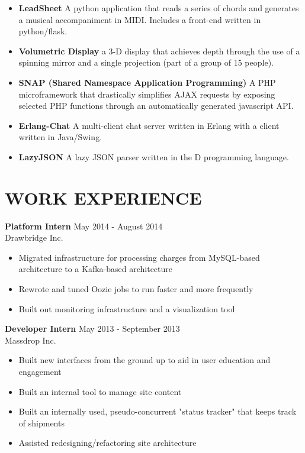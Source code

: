 \documentclass[line,margin]{res}
\begin{document}
\begin{resume}
\begin{itemize} \itemsep -2pt


\item {\bf LeadSheet} A python application that reads a series of chords and 
   generates a musical accompaniment in MIDI. Includes a front-end written in 
   python/flask. 

\item {\bf Volumetric Display} a 3-D display that achieves depth through the 
   use of a spinning mirror and a single projection 
   (part of a group of 15 people).

\item {\bf SNAP (Shared Namespace Application Programming)} 
   A PHP microframework that drastically simplifies AJAX requests by 
   exposing selected PHP functions through an automatically generated
   javascript API.


\item {\bf Erlang-Chat}   A multi-client chat server written in Erlang with a 
   client written in Java/Swing.



\item {\bf LazyJSON}  A lazy JSON parser written in the D programming language.


\end{itemize}
 
\section{WORK EXPERIENCE} 
            {\bf Platform Intern } \hfill May 2014 - August 2014 \\
            Drawbridge Inc.

            \begin{itemize} \itemsep -2pt
               \item Migrated infrastructure for processing charges from MySQL-based architecture 
                  to a Kafka-based architecture
               \item Rewrote and tuned Oozie jobs to run faster and more frequently
               \item Built out monitoring infrastructure and a visualization tool
            \end{itemize}

			   {\bf Developer Intern} \hfill May 2013 - September 2013\\
			   Massdrop Inc.
			   \begin{itemize} \itemsep -2pt
				  \item Built new interfaces from the ground up to aid in user education and engagement
				  \item Built an internal tool to manage site content
				  \item Built an internally used, pseudo-concurrent "status tracker" that keeps track
					 of shipments
				  \item Assisted redesigning/refactoring site architecture
			   \end{itemize}


\end{resume}
\end{document}
